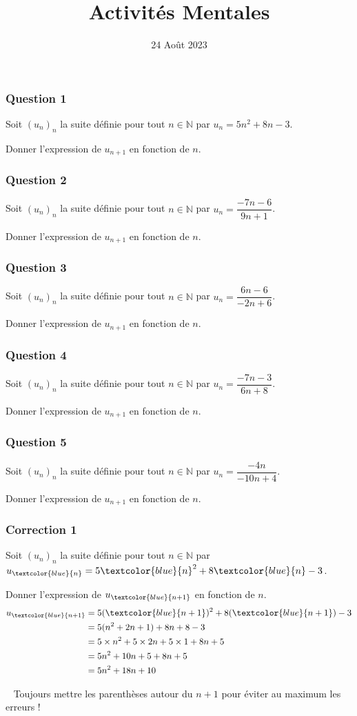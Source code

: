 \documentclass[15pt, mathserif]{beamer}
\title{Activités Mentales}
\date{24 Août 2023}
\newcommand{\N}{\mathbb{N}}			%
\begin{document}
\begin{frame}
    \titlepage
\end{frame}

\begin{frame} 
	\frametitle{Question 1}
Soit $(u_n)_n$ la suite définie pour tout $n \in \N$ par $u_n=5n^2+8n-3$. 
 
 Donner l'expression de $u_{n+1}$ en fonction de $n$.\end{frame}


\begin{frame} 
	\frametitle{Question 2}
Soit $(u_n)_n$ la suite définie pour tout $n \in \N$ par $u_n=\dfrac{-7n-6}{9n+1}$. 
 
 Donner l'expression de $u_{n+1}$ en fonction de $n$.\end{frame}


\begin{frame} 
	\frametitle{Question 3}
Soit $(u_n)_n$ la suite définie pour tout $n \in \N$ par $u_n=\dfrac{6n-6}{-2n+6}$. 
 
 Donner l'expression de $u_{n+1}$ en fonction de $n$.\end{frame}


\begin{frame} 
	\frametitle{Question 4}
Soit $(u_n)_n$ la suite définie pour tout $n \in \N$ par $u_n=\dfrac{-7n-3}{6n+8}$. 
 
 Donner l'expression de $u_{n+1}$ en fonction de $n$.\end{frame}


\begin{frame} 
	\frametitle{Question 5}
Soit $(u_n)_n$ la suite définie pour tout $n \in \N$ par $u_n=\dfrac{-4n}{-10n+4}$. 
 
 Donner l'expression de $u_{n+1}$ en fonction de $n$.\end{frame}


\begin{frame}
\vspace{-10mm}
	\frametitle{Correction 1}
Soit $(u_n)_n$ la suite définie pour tout $n \in \N$ par $u_{\textcolor{blue}{n}}=5\textcolor{blue}{n}^2+8\textcolor{blue}{n}-3$. 
 
 Donner l'expression de $u_{\textcolor{blue}{n+1}}$ en fonction de $n$. \begin{align*} u_{\textcolor{blue}{n+1}}&=5(\textcolor{blue}{n+1})^2+8(\textcolor{blue}{n+1})-3\\ &=5(n^2+2n+1)+8n+8-3\\ &=5\times n^2+5 \times 2n+5\times 1+8n+5\\ &=5n^2+10n+5+8n+5\\ &=5n^2+18n+10\end{align*} 
 
 \bcattention ~ Toujours mettre les parenthèses autour du $n+1$ pour éviter au maximum les erreurs !\end{frame}
\end{document}
